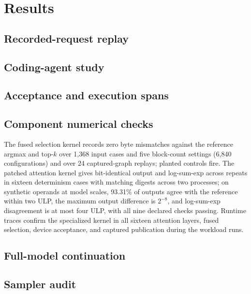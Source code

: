 \documentclass[sigconf,anonymous,review]{acmart}
\begin{document}
\section{Results}
\label{sec:results}
\subsection{Recorded-request replay}
\label{sec:res-replay}


\subsection{Coding-agent study}
\label{sec:res-agent}


\subsection{Acceptance and execution spans}
\label{sec:res-spans}


\subsection{Component numerical checks}
\label{sec:res-component}


The fused selection kernel records zero byte mismatches against the reference argmax and top-$k$ over 1,368 input cases and five block-count settings (6,840 configurations) and over 24 captured-graph replays; planted controls fire. The patched attention kernel gives bit-identical output and log-sum-exp across repeats in sixteen determinism cases with matching digests across two processes; on synthetic operands at model scales, 93.31\% of outputs agree with the reference within two ULP, the maximum output difference is $2^{-8}$, and log-sum-exp disagreement is at most four ULP, with all nine declared checks passing. Runtime traces confirm the specialized kernel in all sixteen attention layers, fused selection, device acceptance, and captured publication during the workload runs.

\subsection{Full-model continuation}
\label{sec:res-fullmodel}


\subsection{Sampler audit}
\label{sec:res-sampler}
\label{sec:sampling-validation}

\end{document}
